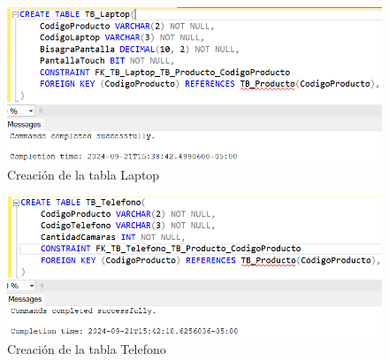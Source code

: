 \begin{figure}[H]
  \centering
  \includegraphics[scale = 0.7]{Imagenes/sql/2.crear_tablas/creacion_tabla_laptop.png}
  \caption{Creación de la tabla Laptop}
\end{figure}

\begin{figure}[H]
  \centering
  \includegraphics[scale = 0.7]{Imagenes/sql/2.crear_tablas/creacion_tabla_telefono.png}
  \caption{Creación de la tabla Telefono}
\end{figure}

